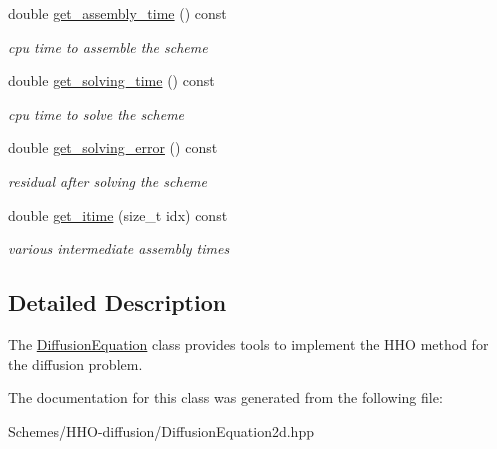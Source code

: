 \begin{DoxyCompactItemize}
double \hyperlink{group__HHO__diffusion_ga2dc3d3d479af0478b99391a1b4f4c8ef}{get\+\_\+assembly\+\_\+time} () const
\begin{DoxyCompactList}\small\item\em cpu time to assemble the scheme \end{DoxyCompactList}\item 
double \hyperlink{group__HHO__diffusion_gaaed6d346ebd3f9dc0faa5051c48558b1}{get\+\_\+solving\+\_\+time} () const
\begin{DoxyCompactList}\small\item\em cpu time to solve the scheme \end{DoxyCompactList}\item 
double \hyperlink{group__HHO__diffusion_ga1df7f75a81e684a345eba1d24aa766b2}{get\+\_\+solving\+\_\+error} () const
\begin{DoxyCompactList}\small\item\em residual after solving the scheme \end{DoxyCompactList}\item 
double \hyperlink{group__HHO__diffusion_gabab4166aeb27d085de9d62f11842c841}{get\+\_\+itime} (size\+\_\+t idx) const
\begin{DoxyCompactList}\small\item\em various intermediate assembly times \end{DoxyCompactList}\end{DoxyCompactItemize}


\subsection{Detailed Description}
The \hyperlink{classHCore2D_1_1DiffusionEquation}{Diffusion\+Equation} class provides tools to implement the H\+HO method for the diffusion problem. 

The documentation for this class was generated from the following file\+:\begin{DoxyCompactItemize}
\item 
Schemes/\+H\+H\+O-\/diffusion/Diffusion\+Equation2d.\+hpp\end{DoxyCompactItemize}
